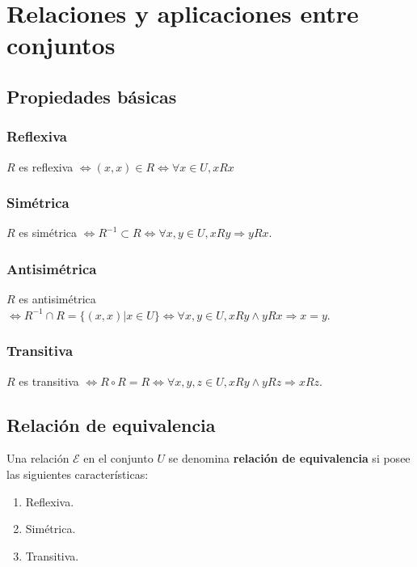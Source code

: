 \chapter{Relaciones y aplicaciones entre conjuntos}

\section{Propiedades básicas}

\subsection{Reflexiva}

$R$ es reflexiva $\Leftrightarrow (x,x) \in R \Leftrightarrow \forall x \in U, xRx$

\subsection{Simétrica}

$R$ es simétrica $\Leftrightarrow R^{-1} \subset R \Leftrightarrow \forall x,y \in U, xRy \Rightarrow yRx$.

\subsection{Antisimétrica}

$R$ es antisimétrica $\Leftrightarrow R^{-1} \cap R = \{(x,x)|x \in U\} \Leftrightarrow \forall x,y \in U, xRy \wedge yRx \Rightarrow x=y$.

\subsection{Transitiva}

$R$ es transitiva $\Leftrightarrow R \circ R = R \Leftrightarrow \forall x,y,z \in U, xRy \wedge yRz \Rightarrow xRz$.

\section{Relación de equivalencia}

Una relación $\mathcal{E}$ en el conjunto $U$ se denomina \textbf{relación de equivalencia} si posee las siguientes características:
\begin{enumerate}
\item Reflexiva.
\item Simétrica.
\item Transitiva.
\end{enumerate}

